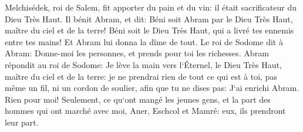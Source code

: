\verse Melchisédek, roi de Salem, fit apporter du pain et du vin: il était sacrificateur du Dieu Très Haut. 
\verse Il bénit Abram, et dit: Béni soit Abram par le Dieu Très Haut, maître du ciel et de la terre! 
\verse Béni soit le Dieu Très Haut, qui a livré tes ennemis entre tes mains! Et Abram lui donna la dîme de tout. 
\verse Le roi de Sodome dit à Abram: Donne-moi les personnes, et prends pour toi les richesses. 
\verse Abram répondit au roi de Sodome: Je lève la main vers l`Éternel, le Dieu Très Haut, maître du ciel et de la terre: 
\verse je ne prendrai rien de tout ce qui est à toi, pas même un fil, ni un cordon de soulier, afin que tu ne dises pas: J`ai enrichi Abram. Rien pour moi! 
\verse Seulement, ce qu`ont mangé les jeunes gens, et la part des hommes qui ont marché avec moi, Aner, Eschcol et Mamré: eux, ils prendront leur part. 


